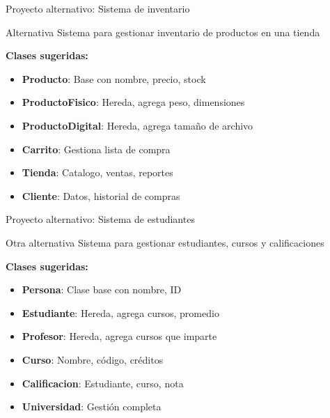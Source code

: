 \documentclass{beamer}
\begin{document}
\begin{frame}{Proyecto alternativo: Sistema de inventario \faBoxes}
\begin{conceptbox}{Alternativa}
Sistema para gestionar inventario de productos en una tienda
\end{conceptbox}

\textbf{Clases sugeridas:}
\small
\begin{itemize}
    \item[\faBox] \textbf{Producto}: Base con nombre, precio, stock
    \item[\faTshirt] \textbf{ProductoFisico}: Hereda, agrega peso, dimensiones
    \item[\faLaptop] \textbf{ProductoDigital}: Hereda, agrega tamaño de archivo
    \item[\faShoppingCart] \textbf{Carrito}: Gestiona lista de compra
    \item[\faStore] \textbf{Tienda}: Catalogo, ventas, reportes
    \item[\faUser] \textbf{Cliente}: Datos, historial de compras
\end{itemize}
\end{frame}

\begin{frame}{Proyecto alternativo: Sistema de estudiantes \faGraduationCap}
\begin{conceptbox}{Otra alternativa}
Sistema para gestionar estudiantes, cursos y calificaciones
\end{conceptbox}

\textbf{Clases sugeridas:}
\small
\begin{itemize}
    \item[\faUser] \textbf{Persona}: Clase base con nombre, ID
    \item[\faUserGraduate] \textbf{Estudiante}: Hereda, agrega cursos, promedio
    \item[\faChalkboardTeacher] \textbf{Profesor}: Hereda, agrega cursos que imparte
    \item[\faBook] \textbf{Curso}: Nombre, código, créditos
    \item[\faClipboardList] \textbf{Calificacion}: Estudiante, curso, nota
    \item[\faUniversity] \textbf{Universidad}: Gestión completa
\end{itemize}
\end{frame}
\end{document}
